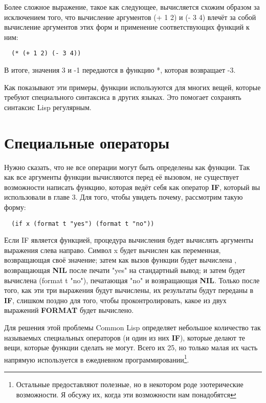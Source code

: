 Более сложное выражение, такое как следующее, вычисляется схожим образом за исключением
того, что вычисление аргументов (+ 1 2) и (- 3 4) влечёт за собой вычисление аргументов
этих форм и применение соответствующих функций к ним:

\begin{lstlisting}
  (* (+ 1 2) (- 3 4))
\end{lstlisting}

В итоге, значения 3 и -1 передаются в функцию *, которая возвращает -3.

Как показывают эти примеры, функции используются для многих вещей, которые требуют
специального синтаксиса в других языках. Это помогает сохранять синтаксис Lisp регулярным.

\section{Специальные операторы}

Нужно сказать, что не все операции могут быть определены как функции. Так как все
аргументы функции вычисляются перед её вызовом, не существует возможности написать
функцию, которая ведёт себя как оператор \textbf{IF}, который вы использовали в главе
3. Для того, чтобы увидеть почему, рассмотрим такую форму:

\begin{lstlisting}
  (if x (format t "yes") (format t "no"))
\end{lstlisting}

Если IF является функцией, процедура вычисления будет вычислять аргументы выражения слева
направо. Символ x будет вычислен как переменная, возвращающая своё значение; затем как
вызов функции будет вычислена , возвращающая \textbf{NIL} после
печати "yes" на стандартный вывод; и затем будет вычислена (format t "no"), печатающая
"no" и возвращающая \textbf{NIL}. Только после того, как эти три выражения будут
вычислены, их результаты будут переданы в \textbf{IF}, слишком поздно для того, чтобы
проконтролировать, какое из двух выражений \textbf{FORMAT} будет вычислено.

Для решения этой проблемы Common Lisp определяет небольшое количество так называемых
специальных операторов (и один из них \textbf{IF}), которые делают те вещи, которые
функции сделать не могут. Всего их 25, но только малая их часть напрямую используется в
ежедневном программировании\footnote{Остальные предоставляют полезные, но в некотором роде
  эзотерические возможности. Я обсужу их, когда эти возможности нам понадобятся}.

